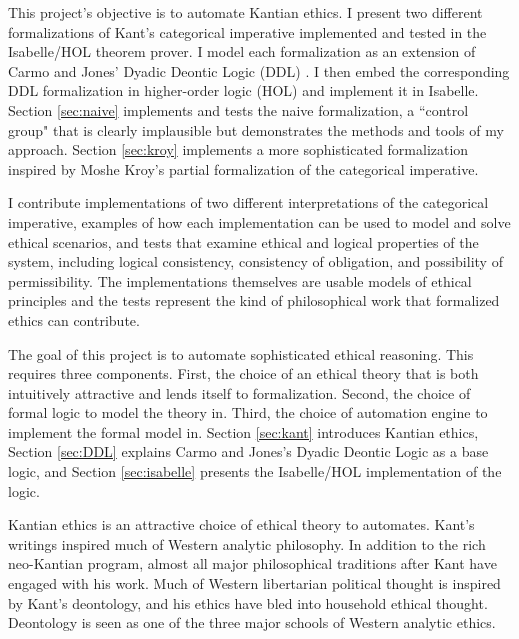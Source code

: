 \begin{isabellebody}
\begin{isamarkuptext}
This project's objective is to automate Kantian ethics. I present two different
formalizations of Kant's categorical imperative implemented and tested in the Isabelle/HOL \cite{isabelle} theorem prover.
I model each formalization  as an extension of Carmo and Jones' Dyadic Deontic Logic (DDL) \cite{CJDDL}. I then embed the corresponding 
DDL formalization in higher-order logic (HOL) and implement it in Isabelle. Section 
\ref{sec:naive} implements and tests the naive formalization, a ``control group" that is clearly implausible but 
demonstrates the methods and tools of my approach. Section \ref{sec:kroy} implements a more sophisticated 
formalization inspired by Moshe Kroy's partial formalization of the categorical imperative. 

I contribute implementations of two different interpretations of the categorical imperative, 
examples of how each implementation can be used to model and solve ethical scenarios, and tests that
examine ethical and logical properties of the system, including logical consistency, consistency
of obligation, and possibility of permissibility. The implementations themselves are usable models 
of ethical principles and the tests represent the kind of philosophical work that formalized ethics 
can contribute.%
\end{isamarkuptext}\isamarkuptrue%
%
\isadelimdocument
%
\endisadelimdocument
%
\isatagdocument
%
\isamarkuptrue%
%
\endisatagdocument
{\isafolddocument}%
%
\isadelimdocument
%
\endisadelimdocument
%
\begin{isamarkuptext}%
The goal of this project is to automate sophisticated ethical reasoning. This requires three
components. First, the choice of an ethical theory that is both intuitively attractive and 
lends itself to formalization. Second, the choice of formal logic to model the theory in. Third, the 
choice of automation engine to implement the formal model in. Section \ref{sec:kant} introduces Kantian
ethics, Section \ref{sec:DDL} explains Carmo and Jones's Dyadic Deontic Logic \cite{CJDDL} as a 
base logic, and Section \ref{sec:isabelle} presents the Isabelle/HOL implementation of the logic.%
\end{isamarkuptext}\isamarkuptrue%
%
\isadelimdocument
%
\endisadelimdocument
%
\isatagdocument
%
\isamarkuptrue%
%
\endisatagdocument
{\isafolddocument}%
%
\isadelimdocument
%
\endisadelimdocument
%
\begin{isamarkuptext}%
Kantian ethics is an attractive choice of ethical theory to automates. Kant's writings inspired much of Western analytic philosophy. 
In addition to the rich neo-Kantian program, almost all major philosophical traditions after Kant have
engaged with his work. Much of Western libertarian political thought is inspired by Kant's deontology,
and his ethics have bled into household ethical thought. Deontology is seen as one of the three major 
schools of Western analytic ethics.


\end{isamarkuptext}
\end{isabellebody}
